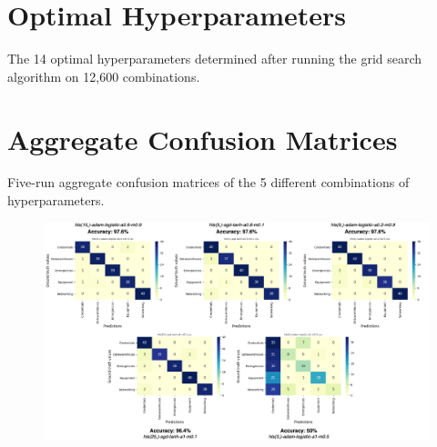 \documentclass[letterpaper,12pt]{article}
\begin{document}
\begin{appendices}

\clearpage
\section{Optimal Hyperparameters}
\label{sec:appendix-optimal-hyperparameters}

The 14 optimal hyperparameters determined after running the grid search algorithm on 12,600 combinations.

\begin{landscape}

\end{landscape}


\clearpage
\section{Aggregate Confusion Matrices}
\label{sec:appendix-confusion_matrices}

Five-run aggregate confusion matrices of the 5 different combinations of hyperparameters.

\begin{figure}[h] 
\centerline{\includegraphics[width=1.1\textwidth]{report/figures/confusion_matrices.png}}
\label{fig:confusion_matrices}
\end{figure}


\clearpage




\end{appendices}
\end{document}
